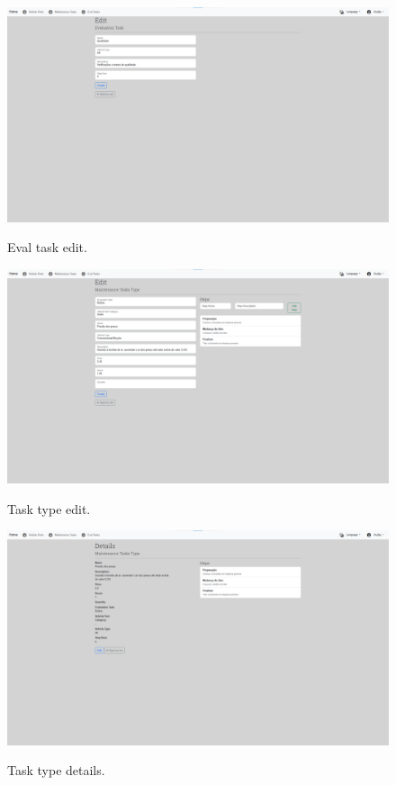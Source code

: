 \begin{figure}[htbp] 
  \caption{Eval task edit.}
  \centering
  \includegraphics[width=\textwidth]{figs/Implementation/dealershipAdmin/evalEdit}
  \label{fig:evalEdit} 
\end{figure}


\begin{figure}[htbp]
  \caption{Task type edit.}
  \centering
  \includegraphics[width=\textwidth]{figs/Implementation/dealershipAdmin/taskEdit}
  \label{fig:taskEdit}
\end{figure}


\begin{figure}[htbp]
  \caption{Task type details.}
  \centering
  \includegraphics[width=\textwidth]{figs/Implementation/dealershipAdmin/taskDetails}
  \label{fig:taskDetails}
\end{figure}

